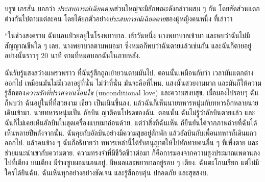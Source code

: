 {\begin{shaded}
		
		
		บรูซ เกรสัน บอกว่า \textit{ประสบการณ์เฉียดตาย}ส่วนใหญ่จะมีลักษณะดังกล่าวผสม ๆ กัน โดยสัดส่วนแตกต่างกันไปตามแต่ละคน โดยได้ยกตัวอย่าง\textit{ประสบการณ์เฉียดตาย}ของผู้หญิงคนหนึ่ง
		ที่เล่าว่า
		
		``ในช่วงสงคราม ฉันนอนป่วยอยู่ในโรงพยาบาล.
		เช้าวันหนึ่ง นางพยาบาลเข้ามา และพบว่าฉันไม่มีสัญญาณชีพใด ๆ เลย.
		นางพยาบาลตามหมอมา ซึ่งหมอก็พบว่าฉันตายแล้วเช่นกัน
		และฉันก็ตายอยู่อย่างนั้นราวๆ 20 นาที ตามที่หมอบอกฉันในภายหลัง.
		
		ฉันรับรู้แสงสว่างแพรวพราว ที่ฉันรู้สึกถูกเย้ายวนตามมันไป.
		ตอนนั้นเหมือนกับว่า เวลามันแตกต่างออกไป เหมือนมันไม่มีเวลาอยู่ที่นั่น ไม่ว่าที่นั่น มันจะคือที่ไหน.
		แสงนั้นสวยงามมาก และมันก็ให้ความรู้สึกของ\textit{ความรักที่ปราศจากเงื่อนไข} (unconditional love) และความสงบสุข.
		เมื่อมองไปรอบๆ ฉันก็พบว่า ฉันอยู่ในที่ที่สวยงาม เขียว เป็นเนินขึ้นลง.
		แล้วฉันก็เห็นนายทหารหนุ่มกับทหารอีกหลายนายเดินเข้ามา.
		นายทหารหนุ่มเป็น อัลบิน ญาติคนโปรดของฉัน.
		ตอนนั้น ฉันไม่รู้ว่าอัลบินตายแล้ว และฉันก็ไม่เคยเห็นอัลบินในชุดเครื่องแบบมาก่อนด้วย.
		แต่ว่าสิ่งที่ฉันเห็น ก็ยืนยันได้จากภาพถ่ายที่ฉันได้เห็นหลายปีหลังจากนั้น.
		ฉันคุยกับอัลบินอย่างมีความสุขอยู่สักพัก แล้วอัลบินกับเพื่อนทหารก็เดินแถวออกไป.
		แล้วคนข้าง ๆ ฉันก็อธิบายว่า ทหารเหล่านี้ได้รับอนุญาตให้ไปทักทายคนอื่น ๆ ที่เพิ่งตาย และช่วยแนะนำเขากับความตาย.
		ความทรงจำที่มีชีวิตชีวาต่อมา ก็คือการมองจากความสูงประมาณเพดานลงไปที่เตียง
		บนเตียง มีร่างซูบผอมนอนอยู่.
		มีหมอและพยาบาลอยู่รอบ ๆ เตียง.
		ฉันตะโกนเรียก แต่ไม่มีใครได้ยินฉัน.
		ฉันเห็นทุกอย่างอย่างชัดเจน และรู้สึกอบอุ่น ปลอดภัย และสุขสงบ.
		

\end{shaded}}
